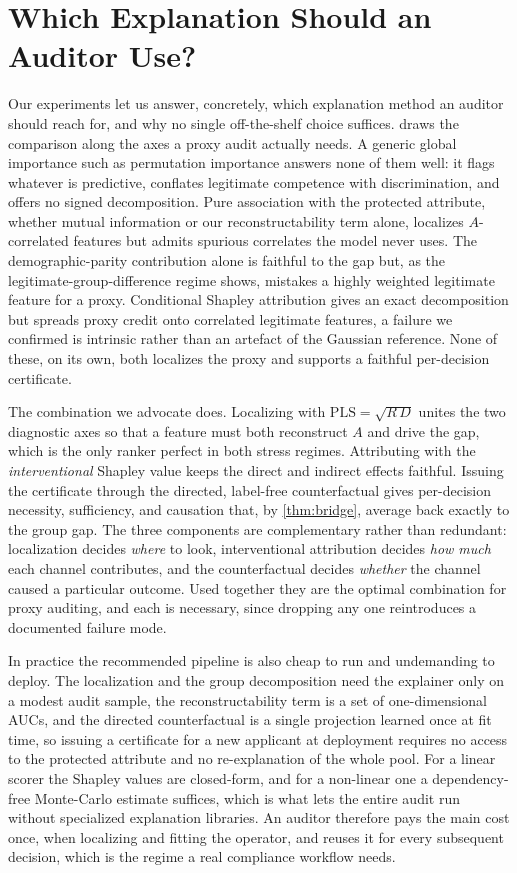 \documentclass[sn-mathphys-num]{sn-jnl}
\newcommand{\PLS}{\mathrm{PLS}}
\begin{document}
\section{Which Explanation Should an Auditor Use?}
\label{sec:methodcompare}
Our experiments let us answer, concretely, which explanation method an auditor
should reach for, and why no single off-the-shelf choice suffices.
 draws the comparison along the axes a proxy audit actually
needs. A generic global importance such as permutation importance answers none of
them well: it flags whatever is predictive, conflates legitimate competence with
discrimination, and offers no signed decomposition. Pure association with the
protected attribute, whether mutual information or our reconstructability term
alone, localizes $A$-correlated features but admits spurious correlates the model
never uses. The demographic-parity contribution alone is faithful to the gap but,
as the legitimate-group-difference regime shows, mistakes a highly weighted
legitimate feature for a proxy. Conditional Shapley attribution gives an exact
decomposition but spreads proxy credit onto correlated legitimate features, a
failure we confirmed is intrinsic rather than an artefact of the Gaussian
reference. None of these, on its own, both localizes the proxy and supports a
faithful per-decision certificate.

The combination we advocate does. Localizing with $\PLS=\sqrt{R\,D}$ unites the
two diagnostic axes so that a feature must both reconstruct $A$ and drive the gap,
which is the only ranker perfect in both stress regimes. Attributing with the
\emph{interventional} Shapley value keeps the direct and indirect effects
faithful. Issuing the certificate through the directed, label-free counterfactual
gives per-decision necessity, sufficiency, and causation that, by
\cref{thm:bridge}, average back exactly to the group gap. The three components are
complementary rather than redundant: localization decides \emph{where} to look,
interventional attribution decides \emph{how much} each channel contributes, and
the counterfactual decides \emph{whether} the channel caused a particular outcome.
Used together they are the optimal combination for proxy auditing, and each is
necessary, since dropping any one reintroduces a documented failure mode.

In practice the recommended pipeline is also cheap to run and undemanding to
deploy. The localization and the group decomposition need the explainer only on a
modest audit sample, the reconstructability term is a set of one-dimensional
AUCs, and the directed counterfactual is a single projection learned once at fit
time, so issuing a certificate for a new applicant at deployment requires no
access to the protected attribute and no re-explanation of the whole pool. For a
linear scorer the Shapley values are closed-form, and for a non-linear one a
dependency-free Monte-Carlo estimate suffices, which is what lets the entire audit
run without specialized explanation libraries. An auditor therefore pays the main
cost once, when localizing and fitting the operator, and reuses it for every
subsequent decision, which is the regime a real compliance workflow needs.
\end{document}
